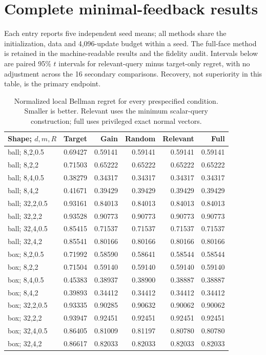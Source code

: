 \section{Complete minimal-feedback results}\label{app:minimal-comparisons}
Each entry reports five independent seed means; all methods share the initialization, data and 4,096-update budget within a seed. The full-face method is retained in the machine-readable results and the fidelity audit. Intervals below are paired 95\% $t$ intervals for relevant-query minus target-only regret, with no adjustment across the 16 secondary comparisons. Recovery, not superiority in this table, is the primary endpoint.
\begin{table}[htbp]\centering\scriptsize
\caption{Normalized local Bellman regret for every prespecified condition. Smaller is better. Relevant uses the minimum scalar-query construction; full uses privileged exact normal vectors.}\label{tab:minimal-policies}
\begin{tabular}{lrrrrr}\toprule
Shape; $d,m,R$ & Target & Gain & Random & Relevant & Full\\\midrule
ball; 8,2,0.5 & 0.69427 & 0.59141 & 0.59141 & 0.59141 & 0.59141\\
ball; 8,2,2 & 0.71503 & 0.65222 & 0.65222 & 0.65222 & 0.65222\\
ball; 8,4,0.5 & 0.38279 & 0.34317 & 0.34317 & 0.34317 & 0.34317\\
ball; 8,4,2 & 0.41671 & 0.39429 & 0.39429 & 0.39429 & 0.39429\\
ball; 32,2,0.5 & 0.93161 & 0.84013 & 0.84013 & 0.84013 & 0.84013\\
ball; 32,2,2 & 0.93528 & 0.90773 & 0.90773 & 0.90773 & 0.90773\\
ball; 32,4,0.5 & 0.85415 & 0.71537 & 0.71537 & 0.71537 & 0.71537\\
ball; 32,4,2 & 0.85541 & 0.80166 & 0.80166 & 0.80166 & 0.80166\\
box; 8,2,0.5 & 0.71992 & 0.58590 & 0.58641 & 0.58544 & 0.58544\\
box; 8,2,2 & 0.71504 & 0.59140 & 0.59140 & 0.59140 & 0.59140\\
box; 8,4,0.5 & 0.45383 & 0.38937 & 0.38900 & 0.38887 & 0.38887\\
box; 8,4,2 & 0.39893 & 0.34412 & 0.34412 & 0.34412 & 0.34412\\
box; 32,2,0.5 & 0.93335 & 0.90285 & 0.90632 & 0.90062 & 0.90062\\
box; 32,2,2 & 0.93947 & 0.92451 & 0.92451 & 0.92451 & 0.92451\\
box; 32,4,0.5 & 0.86405 & 0.81009 & 0.81197 & 0.80780 & 0.80780\\
box; 32,4,2 & 0.86617 & 0.82033 & 0.82033 & 0.82033 & 0.82033\\
\bottomrule\end{tabular}\end{table}
